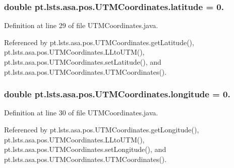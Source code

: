 \hypertarget{classpt_1_1lsts_1_1asa_1_1pos_1_1UTMCoordinates_aad153e29fa181fa437b3dbdb493651fd}{}
\subsubsection[{latitude}]{\setlength{\rightskip}{0pt plus 5cm}double pt.\+lsts.\+asa.\+pos.\+U\+T\+M\+Coordinates.\+latitude = 0.\hspace{0.3cm}{\ttfamily [private]}}\label{classpt_1_1lsts_1_1asa_1_1pos_1_1UTMCoordinates_aad153e29fa181fa437b3dbdb493651fd}


Definition at line 29 of file U\+T\+M\+Coordinates.\+java.



Referenced by pt.\+lsts.\+asa.\+pos.\+U\+T\+M\+Coordinates.\+get\+Latitude(), pt.\+lsts.\+asa.\+pos.\+U\+T\+M\+Coordinates.\+L\+Lto\+U\+T\+M(), pt.\+lsts.\+asa.\+pos.\+U\+T\+M\+Coordinates.\+set\+Latitude(), and pt.\+lsts.\+asa.\+pos.\+U\+T\+M\+Coordinates.\+U\+T\+M\+Coordinates().

\hypertarget{classpt_1_1lsts_1_1asa_1_1pos_1_1UTMCoordinates_a408c6bf75745de5c290f77e65948ea2d}{}
\subsubsection[{longitude}]{\setlength{\rightskip}{0pt plus 5cm}double pt.\+lsts.\+asa.\+pos.\+U\+T\+M\+Coordinates.\+longitude = 0.\hspace{0.3cm}{\ttfamily [private]}}\label{classpt_1_1lsts_1_1asa_1_1pos_1_1UTMCoordinates_a408c6bf75745de5c290f77e65948ea2d}


Definition at line 30 of file U\+T\+M\+Coordinates.\+java.



Referenced by pt.\+lsts.\+asa.\+pos.\+U\+T\+M\+Coordinates.\+get\+Longitude(), pt.\+lsts.\+asa.\+pos.\+U\+T\+M\+Coordinates.\+L\+Lto\+U\+T\+M(), pt.\+lsts.\+asa.\+pos.\+U\+T\+M\+Coordinates.\+set\+Longitude(), and pt.\+lsts.\+asa.\+pos.\+U\+T\+M\+Coordinates.\+U\+T\+M\+Coordinates().

